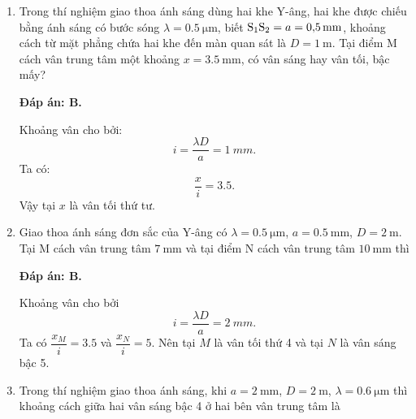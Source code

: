 \begin{enumerate}[label=\bfseries Câu \arabic*:]
{	}
	
\item {} 
	
	\cauhoi
	{Trong thí nghiệm giao thoa ánh sáng dùng hai khe Y-âng, hai khe được chiếu bằng ánh sáng có bước sóng $\lambda=\SI{0.5}{\micro \meter}$, biết $\text S_1 \text S_2 = a = \SI{0.5}{\milli \meter}$, khoảng cách từ mặt phẳng chứa hai khe đến màn quan sát là $D=\SI{1}{\meter}$. Tại điểm M cách vân trung tâm một khoảng $x=\SI{3.5}{\milli \meter}$, có vân sáng hay vân tối, bậc mấy?
	}
	
	\loigiai
	{		\textbf{Đáp án: B.}
		
Khoảng vân cho bởi:
$$
	i = \dfrac{\lambda D}{a} = \SI{1}{mm}.
$$
Ta có:
$$
	\dfrac{x}{i} = \num{3,5}.
$$
Vậy tại $ x $ là vân tối thứ tư.
	}
	
	\item {} 
	
	\cauhoi
	{Giao thoa ánh sáng đơn sắc của Y-âng có $\lambda=\SI{0.5}{\micro \meter}$, $a=\SI{0.5}{\milli \meter}$, $D=\SI{2}{\meter}$. Tại M cách vân trung tâm $\SI{7}{\milli \meter}$ và tại điểm N cách vân trung tâm $\SI{10}{\milli \meter}$ thì
	}
	
	\loigiai
	{		\textbf{Đáp án: B.}
		
Khoảng vân cho bởi
$$
	i = \dfrac{\lambda D}{a} = \SI{2}{mm}.
$$
Ta có $ \dfrac{x_{M}}{i}=\num{3,5} $ và $ \dfrac{x_{N}}{i}=\num{5} $. Nên tại $ M $ là vân tối thứ 4 và tại $ N $ là vân sáng bậc 5.
		
	}
	
	\item {} 
	
	\cauhoi
	{Trong thí nghiệm giao thoa ánh sáng, khi $a=\SI{2}{\milli \meter}$, $D=\SI{2}{\meter}$, $\lambda=\SI{0.6}{\micro \meter}$ thì khoảng cách giữa hai vân sáng bậc 4 ở hai bên vân trung tâm là
	}
	

\end{enumerate}
